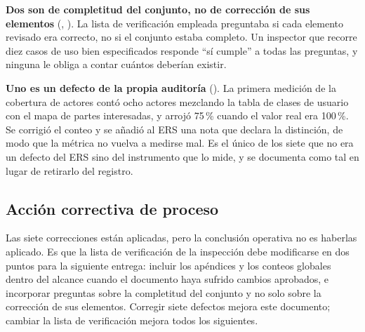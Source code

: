 \textbf{Dos son de completitud del conjunto, no de corrección de sus elementos} (,
). La lista de verificación empleada preguntaba si cada elemento revisado era correcto, no
si el conjunto estaba completo. Un inspector que recorre diez casos de uso bien especificados
responde ``sí cumple'' a todas las preguntas, y ninguna le obliga a contar cuántos deberían existir.

\textbf{Uno es un defecto de la propia auditoría} (). La primera medición de la cobertura
de actores contó ocho actores mezclando la tabla de clases de usuario con el mapa de partes
interesadas, y arrojó 75\,\% cuando el valor real era 100\,\%. Se corrigió el conteo y se añadió al
ERS una nota que declara la distinción, de modo que la métrica no vuelva a medirse mal. Es el único
de los siete que no era un defecto del ERS sino del instrumento que lo mide, y se documenta como tal
en lugar de retirarlo del registro.

\subsection{Acción correctiva de proceso}

Las siete correcciones están aplicadas, pero la conclusión operativa no es haberlas aplicado. Es que
la lista de verificación de la inspección debe modificarse en dos puntos para la siguiente entrega:
incluir los apéndices y los conteos globales dentro del alcance cuando el documento haya sufrido
cambios aprobados, e incorporar preguntas sobre la completitud del conjunto y no solo sobre la
corrección de sus elementos. Corregir siete defectos mejora este documento; cambiar la lista de
verificación mejora todos los siguientes.
